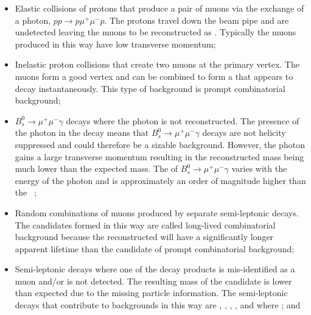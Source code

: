 \begin{itemize}
\item Elastic collisions of protons that produce a pair of muons via the exchange of a photon, $pp \to p \mu^{+} \mu^{-} p$. The protons travel down the beam pipe and are undetected leaving the muons to be reconstructed as \bmumu. Typically the muons produced in this way have low transverse momentum; %
\item Inelastic proton collisions that create two muons at the primary vertex. The muons form a good vertex and can be combined to form a \bsd that appears to decay instantaneously. This type of background is prompt combinatorial background;
\item $B_{s}^{0}\to\mu^{+}\mu^{-}\gamma$ decays where the photon is not reconstructed. The presence of the photon in the decay means that $B_{s}^{0}\to\mu^{+}\mu^{-}\gamma$ decays are not helicity suppressed and could therefore be a sizable background. However, the photon gains a large transverse momentum resulting in the reconstructed \bsd mass being much lower than the expected \bs mass. The \BF of $B_{s}^{0}\to\mu^{+}\mu^{-}\gamma$ varies with the energy of the photon and is approximately an order of magnitude higher than the \bsmumu \BF~\cite{Bobeth:2013uxa,Melikhov:2004mk,Aditya:2012im}; 
\item Random combinations of muons produced by separate semi-leptonic decays. The \bmumu candidates formed in this way are called long-lived combinatorial background because the reconstructed \bsd will have a significantly longer apparent lifetime than the \bsd candidate of prompt combinatorial background; %
\item Semi-leptonic decays where one of the decay products is mis-identified as a muon and/or is not detected. The resulting mass of the \bsd candidate is lower than expected due to the missing particle information. The semi-leptonic decays that contribute to \bmumu backgrounds in this way are \bdpimunu, \bsKmunu, \lambdab, \bupimumu, \bdpimumu and \bcjpsimunu where \jpsimumu; and %

\end{itemize}
